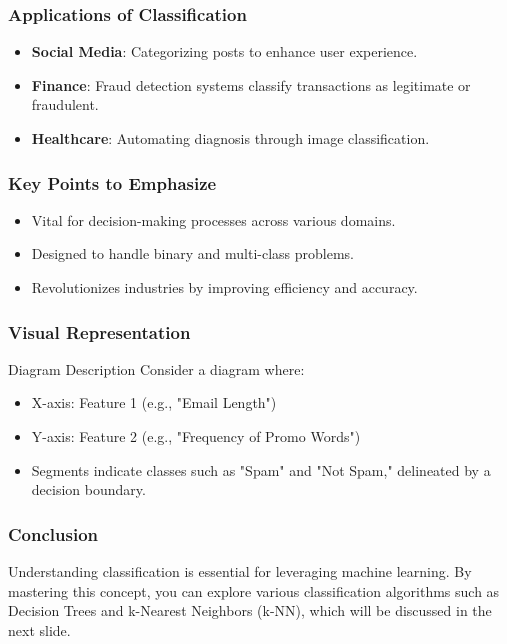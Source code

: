 \documentclass[aspectratio=169]{beamer}
\begin{document}
\begin{frame}[fragile]
    \frametitle{Applications of Classification}
    \begin{itemize}
        \item \textbf{Social Media}: Categorizing posts to enhance user experience.
        \item \textbf{Finance}: Fraud detection systems classify transactions as legitimate or fraudulent.
        \item \textbf{Healthcare}: Automating diagnosis through image classification.
    \end{itemize}
\end{frame}

\begin{frame}[fragile]
    \frametitle{Key Points to Emphasize}
    \begin{itemize}
        \item Vital for decision-making processes across various domains.
        \item Designed to handle binary and multi-class problems.
        \item Revolutionizes industries by improving efficiency and accuracy.
    \end{itemize}
\end{frame}

\begin{frame}[fragile]
    \frametitle{Visual Representation}
    \begin{block}{Diagram Description}
        Consider a diagram where:
        \begin{itemize}
            \item X-axis: Feature 1 (e.g., "Email Length")
            \item Y-axis: Feature 2 (e.g., "Frequency of Promo Words")
            \item Segments indicate classes such as "Spam" and "Not Spam," delineated by a decision boundary.
        \end{itemize}
    \end{block}
\end{frame}

\begin{frame}[fragile]
    \frametitle{Conclusion}
    Understanding classification is essential for leveraging machine learning. By mastering this concept, you can explore various classification algorithms such as Decision Trees and k-Nearest Neighbors (k-NN), which will be discussed in the next slide.
\end{frame}
\end{document}
